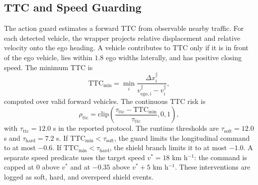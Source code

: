 \documentclass[conference,a4paper]{IEEEtran}
\begin{document}
\subsection{TTC and Speed Guarding}
The action guard estimates a forward TTC from observable nearby traffic. For each detected vehicle, the wrapper projects relative displacement and relative velocity onto the ego heading. A vehicle contributes to TTC only if it is in front of the ego vehicle, lies within $1.8$ ego widths laterally, and has positive closing speed. The minimum TTC is
\begin{equation}
 \mathrm{TTC}_{\min}=\min_i \frac{\Delta x_i^{\parallel}}{v_{\mathrm{ego},i}^{\parallel}-v_i^{\parallel}},
 \label{eq:ttc}
\end{equation}
computed over valid forward vehicles. The continuous TTC risk is
\begin{equation}
 \rho_{\mathrm{ttc}}=\mathrm{clip}\left(\frac{\tau_{\mathrm{ttc}}-\mathrm{TTC}_{\min}}{\tau_{\mathrm{ttc}}},0,1\right),
 \label{eq:ttc-risk}
\end{equation}
with $\tau_{\mathrm{ttc}}=12.0$ s in the reported protocol. The runtime thresholds are $\tau_{\mathrm{soft}}=12.0$ s and $\tau_{\mathrm{hard}}=7.2$ s. If $\mathrm{TTC}_{\min}<\tau_{\mathrm{soft}}$, the guard limits the longitudinal command to at most $-0.6$. If $\mathrm{TTC}_{\min}<\tau_{\mathrm{hard}}$, the shield branch limits it to at most $-1.0$. A separate speed predicate uses the target speed $v^*=18$ km h$^{-1}$: the command is capped at $0$ above $v^*$ and at $-0.35$ above $v^*+5$ km h$^{-1}$. These interventions are logged as soft, hard, and overspeed shield events.
\end{document}
